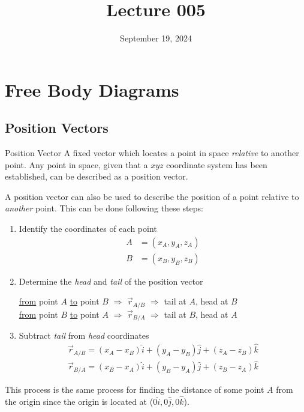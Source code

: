 \documentclass[12pt]{article}
\title{Lecture 005}
\date{September 19, 2024}
\begin{document}
\newpage
\section{Free Body Diagrams}
\label{sec:freeBodyDiagrams}

\subsection{Position Vectors}
\label{ssec:positionVectors}

\begin{definition}{Position Vector}
  A fixed vector which locates a point in space \textit{relative} to another point. Any point
  in space, given that a $xyz$ coordinate system has been established, can be described as
  a position vector.
\end{definition}

A position vector can also be used to describe the position of a point relative to \textit{another}
point. This can be done following these steps:
\begin{enumerate}
  \itemsep0em
  \item Identify the coordinates of each point
    \begin{align*}
      A &= (x_A, y_A, z_A) \\
      B &= (x_B, y_B, z_B)
    \end{align*}
  \item Determine the \textit{head} and \textit{tail} of the position vector
    \begin{center}
      \uline{from} point $A$ \uline{to} point $B$ $\Rightarrow$ $\overrightarrow{r}_{A/B}$ $\Rightarrow$ tail at $A$, head at $B$ \\
      \uline{from} point $B$ \uline{to} point $A$ $\Rightarrow$ $\overrightarrow{r}_{B/A}$ $\Rightarrow$ tail at $B$, head at $A$
    \end{center}
  \item Subtract \textit{tail} from \textit{head} coordinates
    \begin{align*}
      \overrightarrow{r}_{A/B} = (x_A - x_B)\hat{i} + (y_A - y_B)\hat{j} + (z_A - z_B)\hat{k} \\
      \overrightarrow{r}_{B/A} = (x_B - x_A)\hat{i} + (y_B - y_A)\hat{j} + (z_B - z_A)\hat{k}
    \end{align*}
\end{enumerate}

This process is the same process for finding the distance of some point $A$ from the origin
since the origin is located at ($0\hat{i},0\hat{j},0\hat{k}$).
\end{document}
